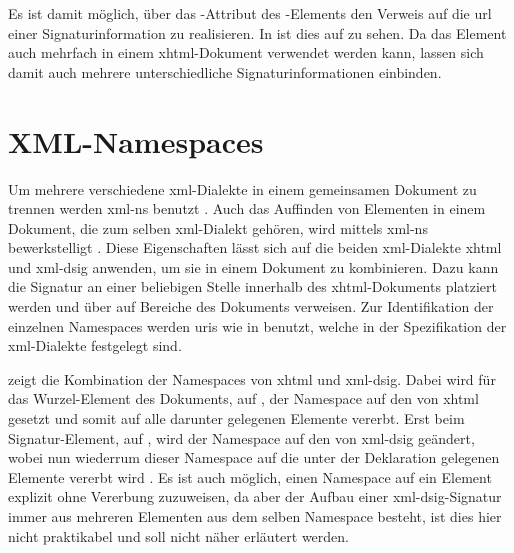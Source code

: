 Es ist damit möglich, über das -Attribut des -Elements den Verweis auf die \gls{url} einer Signaturinformation zu realisieren. In
 ist dies auf  zu sehen. Da das
Element auch mehrfach in einem \gls{xhtml}-Dokument verwendet werden kann, lassen sich damit auch mehrere unterschiedliche Signaturinformationen einbinden.



\section{XML-Namespaces}
\label{sec:Signaturbindung:XML-NS}
Um mehrere verschiedene \gls{xml}-Dialekte in einem gemeinsamen Dokument zu trennen werden \gls{xml-ns} benutzt \cite{xml-ns:w3c}. Auch das Auffinden von
Elementen in einem Dokument, die zum selben \gls{xml}-Dialekt gehören, wird mittels \gls{xml-ns} bewerkstelligt \cite{xml:oreilly}. Diese Eigenschaften lässt
sich auf die beiden \gls{xml}-Dialekte \gls{xhtml} und \gls{xml-dsig} anwenden, um sie in einem Dokument zu kombinieren. Dazu kann die Signatur an einer
beliebigen Stelle innerhalb des \gls{xhtml}-Dokuments platziert werden und über  auf Bereiche des Dokuments verweisen. Zur Identifikation der
einzelnen Namespaces werden \glspl{uri} wie in  benutzt, welche in der Spezifikation der \gls{xml}-Dialekte festgelegt sind.

 zeigt die Kombination der Namespaces von \gls{xhtml} und \gls{xml-dsig}. Dabei wird für das Wurzel-Element des Dokuments,  auf
, der Namespace auf den von \gls{xhtml} gesetzt und somit auf alle darunter gelegenen Elemente vererbt. Erst beim Signatur-Element,
 auf , wird der Namespace auf den von \gls{xml-dsig} geändert, wobei nun wiederrum dieser Namespace auf die unter
der Deklaration gelegenen Elemente vererbt wird \cite{xml:oreilly}. Es ist auch möglich, einen Namespace auf ein Element explizit ohne Vererbung zuzuweisen, da
aber der Aufbau einer \gls{xml-dsig}-Signatur immer aus mehreren Elementen aus dem selben Namespace besteht, ist dies hier nicht praktikabel und soll nicht
näher erläutert werden.

